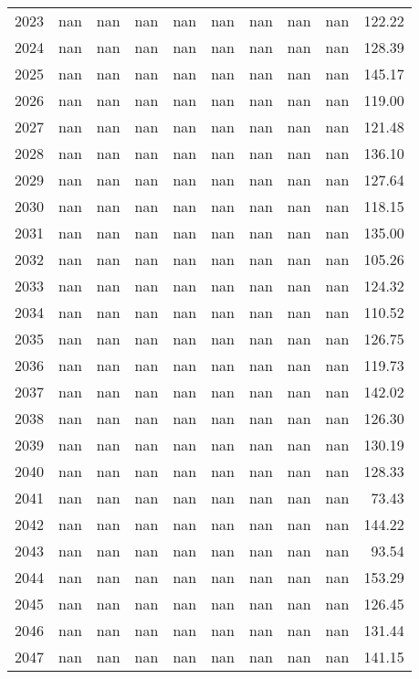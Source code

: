 \begin{tabular}{lrrrrrrrrr}
2023 & nan & nan & nan & nan & nan & nan & nan & nan & 122.22 \\
2024 & nan & nan & nan & nan & nan & nan & nan & nan & 128.39 \\
2025 & nan & nan & nan & nan & nan & nan & nan & nan & 145.17 \\
2026 & nan & nan & nan & nan & nan & nan & nan & nan & 119.00 \\
2027 & nan & nan & nan & nan & nan & nan & nan & nan & 121.48 \\
2028 & nan & nan & nan & nan & nan & nan & nan & nan & 136.10 \\
2029 & nan & nan & nan & nan & nan & nan & nan & nan & 127.64 \\
2030 & nan & nan & nan & nan & nan & nan & nan & nan & 118.15 \\
2031 & nan & nan & nan & nan & nan & nan & nan & nan & 135.00 \\
2032 & nan & nan & nan & nan & nan & nan & nan & nan & 105.26 \\
2033 & nan & nan & nan & nan & nan & nan & nan & nan & 124.32 \\
2034 & nan & nan & nan & nan & nan & nan & nan & nan & 110.52 \\
2035 & nan & nan & nan & nan & nan & nan & nan & nan & 126.75 \\
2036 & nan & nan & nan & nan & nan & nan & nan & nan & 119.73 \\
2037 & nan & nan & nan & nan & nan & nan & nan & nan & 142.02 \\
2038 & nan & nan & nan & nan & nan & nan & nan & nan & 126.30 \\
2039 & nan & nan & nan & nan & nan & nan & nan & nan & 130.19 \\
2040 & nan & nan & nan & nan & nan & nan & nan & nan & 128.33 \\
2041 & nan & nan & nan & nan & nan & nan & nan & nan & 73.43 \\
2042 & nan & nan & nan & nan & nan & nan & nan & nan & 144.22 \\
2043 & nan & nan & nan & nan & nan & nan & nan & nan & 93.54 \\
2044 & nan & nan & nan & nan & nan & nan & nan & nan & 153.29 \\
2045 & nan & nan & nan & nan & nan & nan & nan & nan & 126.45 \\
2046 & nan & nan & nan & nan & nan & nan & nan & nan & 131.44 \\
2047 & nan & nan & nan & nan & nan & nan & nan & nan & 141.15 \\

\end{tabular}
